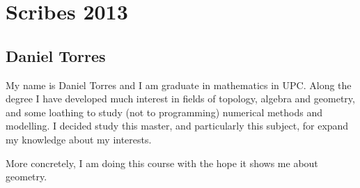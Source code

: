 \chapter*{Scribes 2013}

\section{Daniel Torres}

My name is Daniel Torres and I am graduate in mathematics in UPC. Along the degree I have developed much interest in fields of topology, algebra and geometry, and some loathing to study (not to programming) numerical methods and modelling. I decided study this master, and particularly this subject, for expand my knowledge about my interests.

More concretely, I am doing this course with the hope it shows me about geometry.



